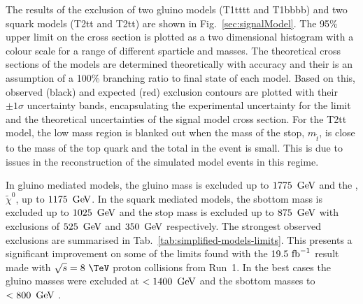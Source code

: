 The results of the exclusion of two gluino models (T1tttt and T1bbbb)
and two squark models (T2tt and T2tt) are shown in
Fig.~\ref{sec:signalModel}. The 95\% \CL upper limit on the cross
section is plotted as a two dimensional histogram with a colour scale
for a range of different sparticle and \LSP masses. The theoretical
cross sections of the models are determined theoretically with \NLO
accuracy and their is an assumption of a 100\% branching ratio to
final state of each model. Based on this, observed (black) and
expected (red) exclusion contours are plotted with their $\pm1\sigma$
uncertainty bands, encapsulating the experimental uncertainty for the
limit and the theoretical uncertainties of the signal model cross
section. For the T2tt model, the low mass region is blanked out when
the mass of the stop, $m_{\tilde{t}}$, is close to the mass of the top
quark and the total \MET in the event is small. This is due to issues
in the \MET reconstruction of the simulated \SUSY model events in this
regime.

In gluino mediated models, the gluino mass is excluded up to 
$1775~\mathrm{\,Ge\kern -0.1em V}$ and the \LSP, $\tilde{\chi}^0$, up to $1175~\mathrm{\,Ge\kern -0.1em V}$. In the
squark mediated models, the sbottom mass is excluded up to $1025~\mathrm{\,Ge\kern -0.1em V}$
and the stop mass is excluded up to $875~\mathrm{\,Ge\kern -0.1em V}$ with \LSP exclusions of
$525~\mathrm{\,Ge\kern -0.1em V}$ and $350~\mathrm{\,Ge\kern -0.1em V}$ respectively. The strongest observed
exclusions are summarised in Tab.~\ref{tab:simplified-models-limits}.
This presents a significant improvement on some of the limits found
with the $19.5~\text{fb}^{-1}$ result made with $\sqrt{s}=8~\tev$ proton
collisions from Run~1. In the best cases the gluino masses were
excluded at $<1400~\mathrm{\,Ge\kern -0.1em V}$ and the sbottom masses to $<800~\mathrm{\,Ge\kern -0.1em V}$
\cite{smsTwiki}.

